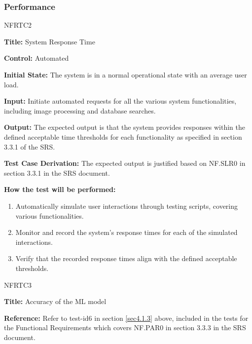 \documentclass[12pt, titlepage]{article}
\begin{document}
\subsubsection{Performance}
\begin{itemize}
    \begin{item}
        NFRTC2
        \begin{mdframed}[linewidth=0.5mm]
            \textbf{Title:} System Response Time \par
            \textbf{Control:} Automated \par
            \textbf{Initial State:} The system is in a normal operational state with an average user load. \par
            \textbf{Input:} Initiate automated requests for all the various system functionalities, including image processing and database searches. \par
            \textbf{Output:} The expected output is that the system provides responses within the defined acceptable time thresholds for each functionality as specified in section 3.3.1 of the SRS. \par
            \textbf{Test Case Derivation:} The expected output is justified based on NF.SLR0 in section 3.3.1 in the SRS document. \par
            \textbf{How the test will be performed:}
            \begin{enumerate}[noitemsep]
                \item Automatically simulate user interactions through testing scripts, covering various functionalities.
                \item Monitor and record the system's response times for each of the simulated interactions.
                \item Verify that the recorded response times align with the defined acceptable thresholds.
            \end{enumerate}
        \end{mdframed}
    \end{item}

    \begin{item}
        NFRTC3
        \begin{mdframed}[linewidth=0.5mm]
            \textbf{Title:} Accuracy of the ML model \par
            \textbf{Reference:} Refer to test-id6 in section \ref{sec4.1.3} above, included in the tests for the Functional Requirements which covers NF.PAR0 in section 3.3.3 in the SRS document.
        \end{mdframed}
    \end{item}


\end{itemize}
\end{document}
